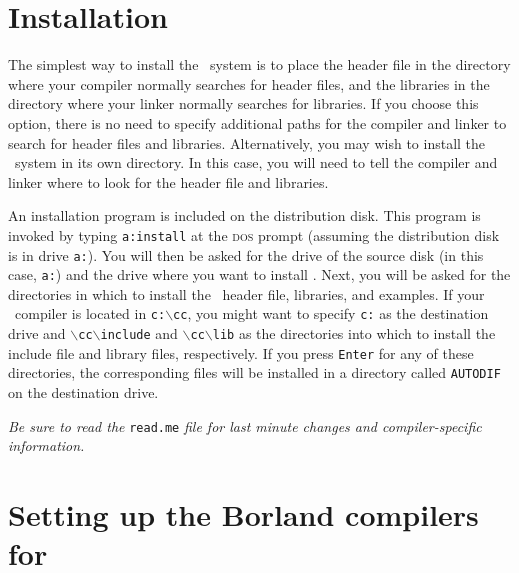 \documentclass{admbmanual}
\newcommand\bs{$\backslash$}
\begin{document}
\section{Installation}

The simplest way to install the \scAD\ system is to place the header file in the
directory where your compiler normally searches for header files, and the
libraries in the directory where your linker normally searches for libraries. If
you choose this option, there is no need to specify additional paths for the
compiler and linker to search for header files and libraries. Alternatively, you
may wish to install the \scAD\ system in its own directory. In this case, you
will need to tell the compiler and linker where to look for the header file and
libraries.

An installation program is included on the distribution disk. This program is
invoked by typing \texttt{a:install} at the \textsc{dos} prompt (assuming the
distribution disk is in drive \texttt{a:}). You will then be asked for the drive
of the source disk (in this case, \texttt{a:}) and the drive where you want to
install \scAD. Next, you will be asked for the directories in which to install
the \scAD\ header file, libraries, and examples. If your \cplus\ compiler is
located in \texttt{c:\bs cc}, you might want to specify \texttt{c:} as the
destination drive and \texttt{\bs cc\bs include} and \texttt{\bs cc\bs lib} as
the directories into which to install the include file and library files,
respectively. If you press \texttt{Enter} for any of these directories, the
corresponding files will be installed in a directory called \texttt{AUTODIF} on
the destination drive.

\textit{Be sure to read the} \texttt{read.me} \textit{file for last minute
  changes and compiler-specific information.}

\section{Setting up the Borland compilers for \scAD}
\end{document}
